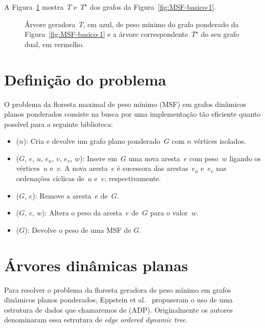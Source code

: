 A Figura~\ref{fig:MSF-figura-2} mostra~$T$ e~$T^\star$ dos grafos da Figura~\ref{fig:MSF-basico-1}.

\begin{figure}[htb]
\scalebox{1.5}{
\centering

}
\caption{Árvore geradora~$T$, em azul, de peso mínimo do grafo ponderado da Figura~\ref{fig:MSF-basico-1} e a árvore correspondente~$T^\star$ do seu grafo dual, em vermelho.}
\label{fig:MSF-figura-2}
\end{figure}





\section{Definição do problema}
\label{sec:definition-MSF}
O problema da floresta maximal de peso mínimo (MSF) em grafos dinâmicos planos ponderados consiste na busca por uma implementação tão eficiente quanto possível para a seguinte biblioteca:

\begin{itemize}
\item \MSFCreate($n$): Cria e devolve um grafo plano ponderado~$G$ com $n$ vértices isolados.
\item \MSFaddEdge($G$, $e$, $u$, $e_u$, $v$, $e_v$, $w$): Insere em~$G$ uma nova aresta~$e$ com peso~$w$ ligando os vértices~$u$ e~$v$. A nova aresta~$e$ é sucessora das arestas~$e_u$ e~$e_v$ nas ordenações cíclicas de~$u$ e~$v$, respectivamente.
\item \MSFdelEdge($G$, $e$): Remove a aresta~$e$ de~$G$.
\item \MSFupdate($G$, $e$, $w$): Altera o peso da aresta~$e$ de~$G$ para o valor~$w$.
\item \MSFweight($G$): Devolve o peso de uma MSF de $G$.
\end{itemize}


\section{Árvores dinâmicas planas}
\label{sec:MSFcomADP}

Para resolver o problema da floresta geradora de peso mínimo em grafos dinâmicos planos ponderados, Eppstein et al.~\cite{EPPSTEIN-planar} propuseram o uso de uma estrutura de dados que chamaremos de  (ADP). Originalmente os autores denominaram essa estrutura de \textit{edge ordered dynamic tree}.

